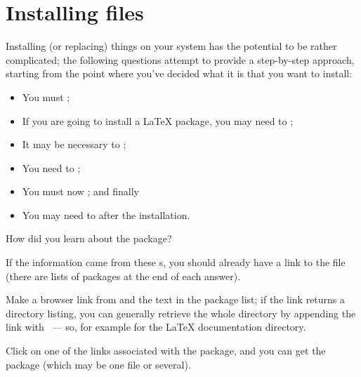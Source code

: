 
\section{Installing \AllTeX{} files}


Installing (or replacing) things on your \AllTeX{} system has the
potential to be rather complicated; the following questions attempt to
provide a step-by-step approach, starting from the point where you've
decided what it is that you want to install:
\begin{itemize}
\item You must ;
\item If you are going to install a \LaTeX{} package, you may need to
  ;
\item It may be necessary to %
  ;
\item You need to %
  ;
\item You must now ; and
  finally
\item You may need to  after the installation.
\end{itemize}


How did you learn about the package?

If the information came from these s, you should already
have a link to the file (there are lists of packages at the end of
each answer).
\begin{narrowversion}
  Make a browser link from  and the text
  in the package list; if the link returns a directory listing, you can
  generally retrieve the whole directory by appending the link with
  ~--- so, for example
   for the \LaTeX{}
  documentation directory.
\end{narrowversion}
\begin{wideversion}
  Click on one of the links associated with the package, and you can
  get the package (which may be one file or several).
\end{wideversion}


